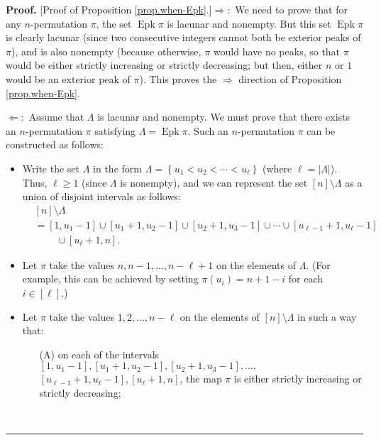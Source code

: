 \documentclass[numbers=enddot,12pt,final,onecolumn,notitlepage]{scrartcl}%
\theoremstyle{definition}
\newenvironment{proof}[1][Proof]{\noindent\textbf{#1.} }{\ \rule{0.5em}{0.5em}}
\begin{document}
\begin{proof}
[Proof of Proposition \ref{prop.when-Epk}.]$\Longrightarrow:$ We need to prove
that for any $n$-permutation $\pi$, the set $\operatorname*{Epk}\pi$ is
lacunar and nonempty. But this set $\operatorname*{Epk}\pi$ is clearly lacunar
(since two consecutive integers cannot both be exterior peaks of $\pi$), and
is also nonempty (because otherwise, $\pi$ would have no peaks, so that $\pi$
would be either strictly increasing or strictly decreasing; but then, either
$n$ or $1$ would be an exterior peak of $\pi$). This proves the
$\Longrightarrow$ direction of Proposition \ref{prop.when-Epk}.

$\Longleftarrow:$ Assume that $\Lambda$ is lacunar and nonempty. We must prove
that there exists an $n$-permutation $\pi$ satisfying $\Lambda
=\operatorname*{Epk}\pi$. Such an $n$-permutation $\pi$ can be constructed as follows:

\begin{itemize}
\item Write the set $\Lambda$ in the form $\Lambda=\left\{  u_{1}<u_{2}%
<\cdots<u_{\ell}\right\}  $ (where $\ell=\left\vert \Lambda\right\vert $).
Thus, $\ell\geq1$ (since $\Lambda$ is nonempty), and we can represent the set
$\left[  n\right]  \setminus\Lambda$ as a union of disjoint intervals as
follows:
\begin{align*}
&  \left[  n\right]  \setminus\Lambda\\
&  =\left[  1,u_{1}-1\right]  \cup\left[  u_{1}+1,u_{2}-1\right]  \cup\left[
u_{2}+1,u_{3}-1\right]  \cup\cdots\cup\left[  u_{\ell-1}+1,u_{\ell}-1\right]
\\
&  \ \ \ \ \ \ \ \ \ \ \cup\left[  u_{\ell}+1,n\right]  .
\end{align*}


\item Let $\pi$ take the values $n,n-1,\ldots,n-\ell+1$ on the elements of
$\Lambda$. (For example, this can be achieved by setting $\pi\left(
u_{i}\right)  =n+1-i$ for each $i\in\left[  \ell\right]  $.)

\item Let $\pi$ take the values $1,2,\ldots,n-\ell$ on the elements of
$\left[  n\right]  \setminus\Lambda$ in such a way that:

\begin{itemize}
\item[(A)] on each of the intervals $\left[  1,u_{1}-1\right]  ,\left[
u_{1}+1,u_{2}-1\right]  ,\left[  u_{2}+1,u_{3}-1\right]  ,\ldots,$%
\newline$\left[  u_{\ell-1}+1,u_{\ell}-1\right]  ,\left[  u_{\ell}+1,n\right]
$, the map $\pi$ is either strictly increasing or strictly decreasing;


\end{itemize}
\end{itemize}
\end{proof}
\end{document}
